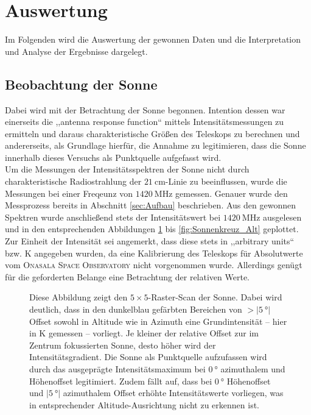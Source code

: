 \section{Auswertung}
Im Folgenden wird die Auswertung der gewonnen Daten und die Interpretation und Analyse der Ergebnisse dargelegt.
    \subsection{Beobachtung der Sonne}
    Dabei wird mit der Betrachtung der Sonne begonnen.
    Intention dessen war einerseits die ,,antenna response function`` mittels Intensitätsmessungen zu ermitteln und daraus charakteristische Größen des Teleskops zu berechnen und andererseits, als Grundlage hierfür, die Annahme zu legitimieren, dass die Sonne innerhalb dieses Versuchs als Punktquelle aufgefasst wird.\\

    Um die Messungen der Intensitätsspektren der Sonne nicht durch charakteristische Radiostrahlung der $\SI{21}{\centi \metre}$-Linie zu beeinflussen,
    wurde die Messungen bei einer Freqeunz von $\SI{1420}{\mega \hertz}$ gemessen.
    Genauer wurde den Messprozess bereits in Abschnitt \ref{sec:Aufbau} beschrieben. 
    Aus den gewonnen Spektren wurde anschließend stets der Intensitätswert bei $\SI{1420}{\mega \hertz}$ ausgelesen und in den entsprechenden Abbildungen \ref{fig:Sonnenabbild} bis \ref{fig:Sonnenkreuz_Alt} geplottet. 
    Zur Einheit der Intensität sei angemerkt, dass diese stets in ,,arbitrary units`` bzw. \si{\kelvin} angegeben wurden,
    da eine Kalibrierung des Teleskops für Absolutwerte vom \textsc{Onasala Space Observatory} nicht vorgenommen wurde.
    Allerdings genügt für die geforderten Belange eine Betrachtung der relativen Werte.\\

    \begin{figure}[ht]
        \centering
        
        \caption[Raster-Scan der Sonne]{Diese Abbildung zeigt den $5 \times 5$-Raster-Scan der Sonne. Dabei wird deutlich, dass in den dunkelblau gefärbten Bereichen von $>\vert \SI{5}{\degree}\vert$ Offset sowohl in Altitude wie in Azimuth eine Grundintensität -- hier in \si{\kelvin} gemessen -- vorliegt. Je kleiner der relative Offset zur im Zentrum fokussierten Sonne, desto höher wird der Intensitätsgradient. Die Sonne als Punktquelle aufzufassen wird durch das ausgeprägte Intensitätsmaximum bei $\SI{0}{\degree}$ azimuthalem und Höhenoffset legitimiert. Zudem fällt auf, dass bei $\SI{0}{\degree}$ Höhenoffset und $\vert\SI{5}{\degree}\vert$ azimuthalem Offset erhöhte Intensitätswerte vorliegen, was in entsprechender Altitude-Ausrichtung nicht zu erkennen ist.}
        \label{fig:Sonnenabbild}
    \end{figure}

